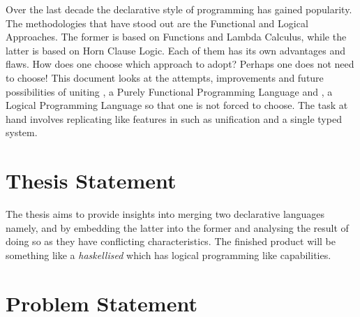 \documentclass[thesis-solanki.tex]{subfiles}
\begin{document}
Over the last decade the declarative style of programming has gained popularity.
The methodologies that have stood out are the Functional and Logical Approaches.
The former is based on Functions and Lambda Calculus, while the latter is based on Horn Clause Logic.
Each of them has its own advantages and ﬂaws.
How does one choose which approach to adopt?
Perhaps one does not need to choose!
This document looks at the attempts, improvements and future possibilities of uniting , a Purely
Functional Programming Language and , a Logical Programming Language so that one is not forced to
choose. The task at hand involves replicating  like features in  such as unification and a single
typed system.



\section{Thesis Statement}

The thesis aims to provide insights into merging two declarative languages namely,  and
 by embedding the latter into the former and analysing the result of doing so as they have conflicting
characteristics.
The finished product will be something like a \textit{haskellised}  which has logical programming like
capabilities.


\section{Problem Statement}
\end{document}

